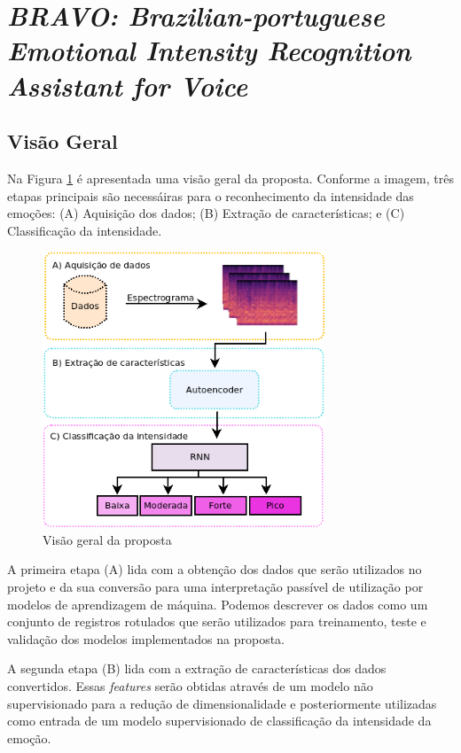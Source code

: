 \section{\textit{BRAVO: Brazilian-portuguese Emotional Intensity Recognition Assistant for Voice}}

\subsection{Visão Geral}

Na Figura \ref{fig:visaogeralproposta} é apresentada uma visão geral da proposta. Conforme a imagem, três etapas principais são necessáiras para o reconhecimento da intensidade das emoções: (A) Aquisição dos dados; (B) Extração de características; e (C) Classificação da intensidade.

\begin{figure}[!h]
\centering
\includegraphics[width=0.75\textwidth]{imagens/arquitetura-visao-geral.png}
\caption{\label{fig:visaogeralproposta}Visão geral da proposta}
\end{figure}

A primeira etapa (A) lida com a obtenção dos dados que serão utilizados no projeto e da sua conversão para uma interpretação passível de utilização por modelos de aprendizagem de máquina. Podemos descrever os dados como um conjunto de registros rotulados que serão utilizados para treinamento, teste e validação dos modelos implementados na proposta.

A segunda etapa (B) lida com a extração de características dos dados convertidos. Essas \textit{features} serão obtidas através de um modelo não supervisionado para a redução de dimensionalidade e posteriormente utilizadas como entrada de um modelo supervisionado de classificação da intensidade da emoção.


